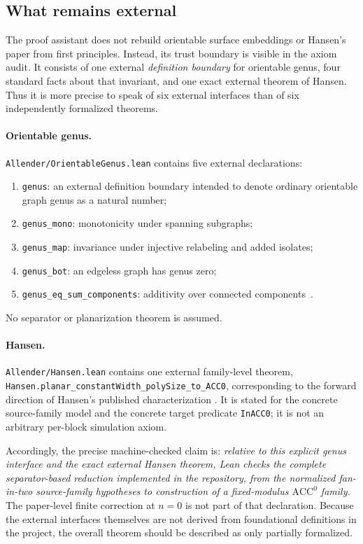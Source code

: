 \documentclass[11pt]{article}
\theoremstyle{definition}
\newcommand{\ACC}{\mathrm{ACC}^{0}}
\begin{document}
\subsection{What remains external}

The proof assistant does not rebuild orientable surface embeddings or
Hansen's paper from first principles.  Instead, its trust boundary is visible
in the axiom audit.  It consists of one external \emph{definition boundary}
for orientable genus, four standard facts about that invariant, and one exact
external theorem of Hansen.  Thus it is more precise to speak of six external
interfaces than of six independently formalized theorems.

\paragraph{Orientable genus.}
\texttt{Allender/OrientableGenus.lean} contains five external declarations:
\begin{enumerate}
  \item \texttt{genus}: an external definition boundary intended to denote
        ordinary orientable graph genus as a natural number;
  \item \nolinkurl{genus_mono}: monotonicity under spanning subgraphs;
  \item \nolinkurl{genus_map}: invariance under injective relabeling and added
        isolates;
  \item \nolinkurl{genus_bot}: an edgeless graph has genus zero;
  \item \nolinkurl{genus_eq_sum_components}: additivity over connected
        components~\cite{BHKY1962}.
\end{enumerate}
No separator or planarization theorem is assumed.

\paragraph{Hansen.}
\texttt{Allender/Hansen.lean} contains one external family-level theorem,
\nolinkurl{Hansen.planar_constantWidth_polySize_to_ACC0}, corresponding to
the forward direction of Hansen's published characterization
\cite{Hansen2006}.  It is stated for the concrete source-family model and the
concrete target predicate \texttt{InACC0}; it is not an arbitrary per-block
simulation axiom.

Accordingly, the precise machine-checked claim is: \emph{relative to this
explicit genus interface and the exact external Hansen theorem, Lean checks
the complete separator-based reduction implemented in the repository, from
the normalized fan-in-two source-family hypotheses to construction of a
fixed-modulus $\ACC$ family.}  The paper-level finite correction at $n=0$ is
not part of that declaration.  Because the external interfaces themselves are
not derived from foundational definitions in the project, the overall theorem
should be described as only partially formalized.
\end{document}
